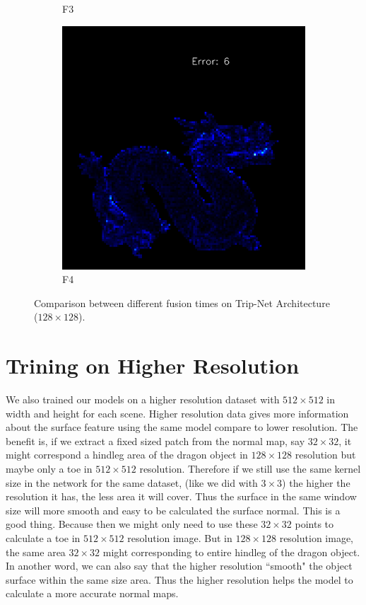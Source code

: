 \begin{figure}
\begin{subfigure}[b]{0.18\linewidth}
		\caption{F3}
	\end{subfigure}
	\begin{subfigure}[b]{0.18\linewidth}
		\includegraphics[width=\linewidth]{./Figures/gcnn_synthetic/fancy_eval_7_error_f4.png}
		\caption{F4}
	\end{subfigure}
	
	\decoRule
	\caption{Comparison between different fusion times on Trip-Net Architecture ($ 128\times128 $). }
	\label{fig:tripnet-fusion-eval}
\end{figure}




\section{Trining on Higher Resolution}
We also trained our models on a higher resolution dataset with $ 512\times 512 $ in width and height for each scene. Higher resolution data gives more information about the surface feature using the same model compare to lower resolution. The benefit is, if we extract a fixed sized patch from the normal map, say $ 32 \times 32 $, it might correspond a hindleg area of the dragon object in $ 128\times 128 $ resolution but maybe only a toe in $ 512\times 512 $ resolution. Therefore if we still use the same kernel size in the network for the same dataset, (like we did with $ 3\times 3 $) the higher the resolution it has, the less area it will cover. Thus the surface in the same window size will more smooth and easy to be calculated the surface normal. This is a good thing. Because then we might only need to use these $ 32\times 32 $ points to calculate a toe in $ 512\times512 $ resolution image. But in $ 128\times128 $ resolution image, the same area $ 32\times32 $ might corresponding to entire  hindleg of the dragon object. In another word, we can also say that the higher resolution ``smooth" the object surface within the same size area. Thus the higher resolution helps the model to calculate a more accurate normal maps. 


